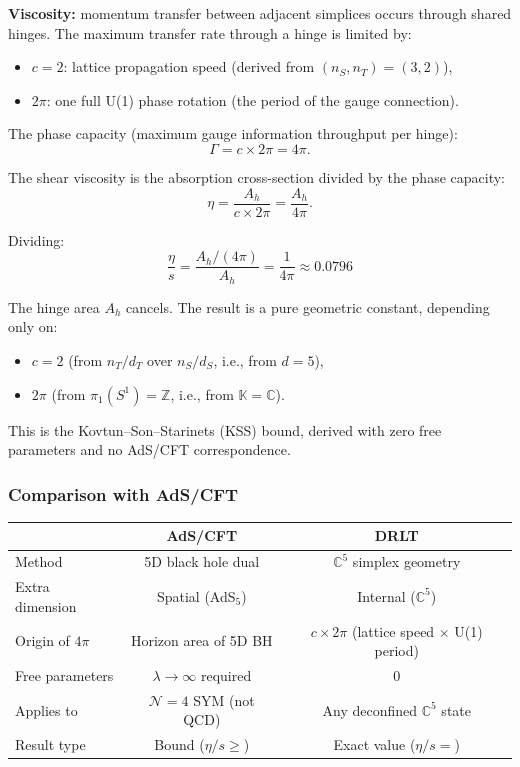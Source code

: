 \documentclass[12pt]{article}
\theoremstyle{remark}
\theoremstyle{definition}
\newcommand{\CC}{\mathbb{C}}
\begin{document}
\textbf{Viscosity:} momentum transfer between adjacent simplices occurs through shared hinges. The maximum transfer rate through a hinge is limited by:
\begin{itemize}
\item $c = 2$: lattice propagation speed (derived from $(n_S, n_T) = (3, 2)$),
\item $2\pi$: one full U(1) phase rotation (the period of the gauge connection).
\end{itemize}

The phase capacity (maximum gauge information throughput per hinge):
\begin{equation}
\Gamma = c \times 2\pi = 4\pi.
\end{equation}

The shear viscosity is the absorption cross-section divided by the phase capacity:
\begin{equation}
\eta = \frac{A_h}{c \times 2\pi} = \frac{A_h}{4\pi}.
\end{equation}

Dividing:
\begin{equation}
\boxed{\frac{\eta}{s} = \frac{A_h/(4\pi)}{A_h} = \frac{1}{4\pi} \approx 0.0796}
\end{equation}

The hinge area $A_h$ cancels. The result is a pure geometric constant, depending only on:
\begin{itemize}
\item $c = 2$ (from $n_T/d_T$ over $n_S/d_S$, i.e., from $d = 5$),
\item $2\pi$ (from $\pi_1(S^1) = \mathbb{Z}$, i.e., from $\mathbb{K} = \CC$).
\end{itemize}

This is the Kovtun--Son--Starinets (KSS) bound, derived with zero free parameters and no AdS/CFT correspondence.

\subsubsection{Comparison with AdS/CFT}

\begin{center}
\begin{tabular}{lcc}
\hline
& AdS/CFT & DRLT \\
\hline
Method & 5D black hole dual & $\CC^5$ simplex geometry \\
Extra dimension & Spatial (AdS$_5$) & Internal ($\CC^5$) \\
Origin of $4\pi$ & Horizon area of 5D BH & $c \times 2\pi$ (lattice speed $\times$ U(1) period) \\
Free parameters & $\lambda \to \infty$ required & 0 \\
Applies to & $\mathcal{N} = 4$ SYM (not QCD) & Any deconfined $\CC^5$ state \\
Result type & Bound ($\eta/s \geq$) & Exact value ($\eta/s =$) \\
\hline
\end{tabular}
\end{center}
\end{document}
